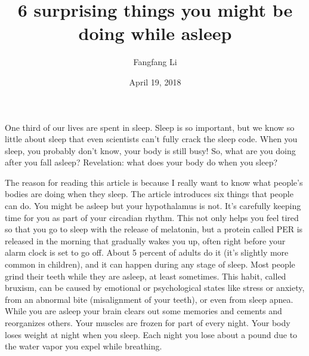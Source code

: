 \documentclass{article}
\author{Fangfang Li}
\date{April 19, 2018}
\title{6 surprising things you might be doing while asleep}
\begin{document}
\maketitle
One third of our lives are spent in sleep. Sleep is so important, but we know so little about sleep that even scientists can't fully crack the sleep code. When you sleep, you probably don't know, your body is still busy!
So, what are you doing after you fall asleep? Revelation: what does your body do when you sleep?

The reason for reading this article is because I really want to know what people's bodies are doing when they sleep. The article introduces six things that people can do. You might be asleep but your hypothalamus is not. It's carefully keeping time for you as part of your circadian rhythm. This not only helps you feel tired so that you go to sleep with the release of melatonin, but a protein called PER is released in the morning that gradually wakes you up, often right before your alarm clock is set to go off. About 5 percent of adults do it (it's slightly more common in children), and it can happen during any stage of sleep. Most people grind their teeth while they are asleep, at least sometimes. This habit, called bruxism, can be caused by emotional or psychological states like stress or anxiety, from an abnormal bite (misalignment of your teeth), or even from sleep apnea. While you are asleep your brain clears out some memories and cements and reorganizes others. Your muscles are frozen for part of every night. Your body loses weight at night when you sleep. Each night you lose about a pound due to the water vapor you expel while breathing.
\end{document}
